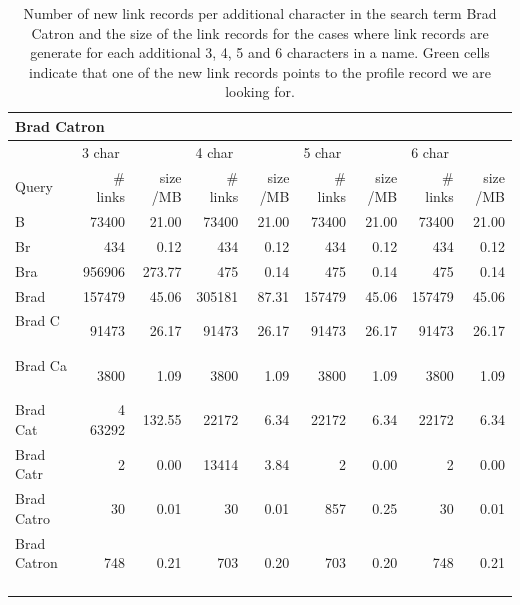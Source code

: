 \begin{table}[!htb]
\caption{Number of new link records per additional character in the search term Brad Catron and the size of the link records for the cases where link records are generate for each additional 3, 4, 5 and 6 characters in a name. Green cells indicate that one of the new link records points to the profile record we are looking for.}
\begin{center}
\scriptsize{
  \begin{tabular}{ | l | r | r | r | r | r | r | r | r | }
    \hline                       
    \multicolumn{9}{|l|}{\textbf{Brad Catron}} \\ 
    \hline                       
    \hline  
    & \multicolumn{2}{l|}{3 char} & \multicolumn{2}{l|}{4 char} & \multicolumn{2}{l|}{5 char} & \multicolumn{2}{l|}{6 char}  \\
    Query & \# links & size /MB & \# links & size /MB & \# links & size /MB & \# links & size /MB  \\
    \hline  
    B                & 73400 & 21.00 & 73400 & 21.00 & 73400 & 21.00 & 73400 & 21.00 \\
    \hline
    Br               & 434 & 0.12 & 434 & 0.12 & 434 & 0.12 & 434 & 0.12 \\
    \hline
    Bra              & \cellcolor{green} 956906 & 273.77 & 475 & 0.14 & 475 & 0.14 & 475 & 0.14 \\
    \hline
    Brad             & \cellcolor{green} 157479 & 45.06 & \cellcolor{green} 305181 & 87.31 & \cellcolor{green} 157479 & 45.06 & \cellcolor{green} 157479 & 45.06 \\
    \hline
    Brad C           & 91473 & 26.17 & 91473 & 26.17 & 91473 & 26.17 & 91473 & 26.17 \\
    \hline
    Brad Ca          & 3800 & 1.09 & 3800 & 1.09 & 3800 & 1.09 & 3800 & 1.09 \\
    \hline
    Brad Cat         & 4\cellcolor{green} 63292 & 132.55 & 22172 & 6.34 & 22172 & 6.34 & 22172 & 6.34 \\
    \hline
    Brad Catr        & 2 & 0.00 & \cellcolor{green} 13414 & 3.84 & 2 & 0.00 & 2 & 0.00 \\
    \hline
    Brad Catro       & 30 & 0.01 & 30 & 0.01 & \cellcolor{green} 857 & 0.25 & 30 & 0.01 \\
    \hline
    Brad Catron      & \cellcolor{green} 748 & 0.21 & \cellcolor{green} 703 & 0.20 & \cellcolor{green} 703 & 0.20 & \cellcolor{green} 748 & 0.21 \\
    \hline  
  \end{tabular}
}
\end{center}
\label{tableAmericanName}
\end{table}

